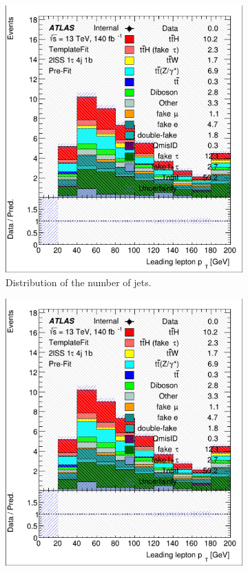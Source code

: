 \begin{figure}[htb!]
    \begin{subfigure}{0.45\textwidth}
        \includegraphics[width=\linewidth]{figures/plots/histograms/njets.png}
        \caption{Distribution of the number of jets.}
        \label{fig:njets}
    \end{subfigure}\hfill%
    \begin{subfigure}{0.45\textwidth}
        \includegraphics[width=\linewidth]{figures/plots/histograms/nbjets.png}

\end{subfigure}
\end{figure}
